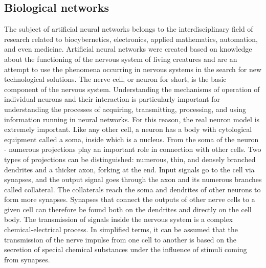 \subsection{Biological networks}
The subject of artificial neural networks belongs to the interdisciplinary field of research 
related to biocybernetics, electronics, applied mathematics, automation, and even medicine.
Artificial neural networks were created based on knowledge about the functioning of the nervous
system of living creatures and are an attempt to use the phenomena occurring in nervous systems
in the search for new technological solutions.
The nerve cell, or neuron for short, is the basic component of the nervous system.
Understanding the mechanisms of operation of individual neurons and their interaction is 
particularly important for understanding the processes of acquiring, transmitting, processing,
and using information running in neural networks.
For this reason, the real neuron model is extremely important. Like any other cell, a neuron has
a body with cytological equipment called a soma, inside which is a nucleus.
From the soma of the neuron - numerous projections play an important role in connection with
other cells.
Two types of projections can be distinguished: numerous, thin, and densely branched dendrites
and a thicker axon, forking at the end.
Input signals go to the cell via synapses, and the output signal goes through the axon
and its numerous branches called collateral.
The collaterals reach the soma and dendrites of other neurons to form more synapses. 
Synapses that connect the outputs of other nerve cells to a given cell can therefore be found
both on the dendrites and directly on the cell body.
The transmission of signals inside the nervous system is a complex chemical-electrical process. 
In simplified terms, it can be assumed that the transmission of the nerve impulse from one cell to
another is based on the secretion of special chemical substances under the influence of stimuli 
coming from synapses.

